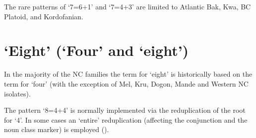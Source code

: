 The rare patterns of ‘7=6+1’ and ‘7=4+3’ are limited to Atlantic Bak, Kwa, BC Platoid, and Kordofanian.


\section{‘Eight’ (‘Four’ and ‘eight’)}%
 
In the majority of the NC families the term for ‘eight’ is historically based on the term for ‘four’ (with the exception of Mel, Kru, Dogon, Mande and Western NC isolates). 

The pattern ‘8=4+4’ is normally implemented via the reduplication of the root for ‘4’. In some cases an ‘entire’ reduplication (affecting the conjunction and the noun class marker) is employed ().  

